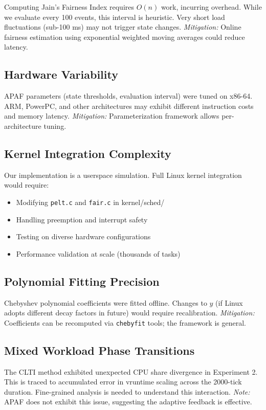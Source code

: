 \documentclass[conference]{IEEEtran}
\begin{document}
Computing Jain's Fairness Index requires $O(n)$ work, incurring overhead. While we evaluate every 100 events, this interval is heuristic. Very short load fluctuations (sub-100 ms) may not trigger state changes. \textit{Mitigation:} Online fairness estimation using exponential weighted moving averages could reduce latency.

\subsection{Hardware Variability}

APAF parameters (state thresholds, evaluation interval) were tuned on x86-64. ARM, PowerPC, and other architectures may exhibit different instruction costs and memory latency. \textit{Mitigation:} Parameterization framework allows per-architecture tuning.

\subsection{Kernel Integration Complexity}

Our implementation is a userspace simulation. Full Linux kernel integration would require:
\begin{itemize}
\item Modifying \texttt{pelt.c} and \texttt{fair.c} in kernel/sched/
\item Handling preemption and interrupt safety
\item Testing on diverse hardware configurations
\item Performance validation at scale (thousands of tasks)
\end{itemize}

\subsection{Polynomial Fitting Precision}

Chebyshev polynomial coefficients were fitted offline. Changes to $y$ (if Linux adopts different decay factors in future) would require recalibration. \textit{Mitigation:} Coefficients can be recomputed via \texttt{chebyfit} tools; the framework is general.

\subsection{Mixed Workload Phase Transitions}

The CLTI method exhibited unexpected CPU share divergence in Experiment 2. This is traced to accumulated error in vruntime scaling across the 2000-tick duration. Fine-grained analysis is needed to understand this interaction. \textit{Note:} APAF does not exhibit this issue, suggesting the adaptive feedback is effective.
\end{document}
